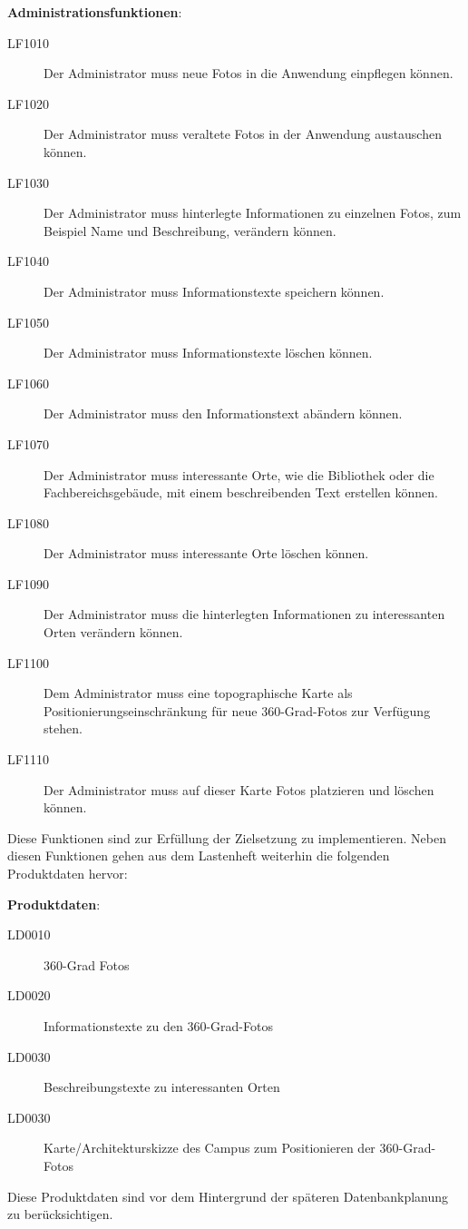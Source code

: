 \textbf{Administrationsfunktionen}:

\begin{description}
  \item[LF1010] Der Administrator muss neue Fotos in die Anwendung einpflegen
  können.
  \item[LF1020] Der Administrator muss veraltete Fotos in der Anwendung
  austauschen können.
  \item[LF1030] Der Administrator muss hinterlegte Informationen zu einzelnen
  Fotos, zum Beispiel Name und Beschreibung, verändern können.
  \item[LF1040] Der Administrator muss Informationstexte speichern können.
  \item[LF1050] Der Administrator muss Informationstexte löschen können.
  \item[LF1060] Der Administrator muss den Informationstext abändern können.
  \item[LF1070] Der Administrator muss interessante Orte, wie die Bibliothek
  oder die Fachbereichsgebäude, mit einem beschreibenden Text erstellen können.
  \item[LF1080] Der Administrator muss interessante Orte löschen können.
  \item[LF1090] Der Administrator muss die hinterlegten Informationen zu
  interessanten Orten verändern können.
  \item[LF1100] Dem Administrator muss eine topographische Karte als
  Positionierungseinschränkung für neue 360-Grad-Fotos zur Verfügung stehen.
  \item[LF1110] Der Administrator muss auf dieser Karte Fotos platzieren und
  löschen können.
\end{description}

Diese Funktionen sind zur Erfüllung der Zielsetzung zu implementieren. Neben
diesen Funktionen gehen aus dem Lastenheft weiterhin die folgenden Produktdaten
hervor:

\textbf{Produktdaten}:

\begin{description}
  \item[LD0010] 360-Grad Fotos
  \item[LD0020] Informationstexte zu den 360-Grad-Fotos
  \item[LD0030] Beschreibungstexte zu interessanten Orten
  \item[LD0030] Karte/Architekturskizze des Campus zum Positionieren der
  360-Grad-Fotos
\end{description}

Diese Produktdaten sind vor dem Hintergrund der späteren Datenbankplanung zu
berücksichtigen.